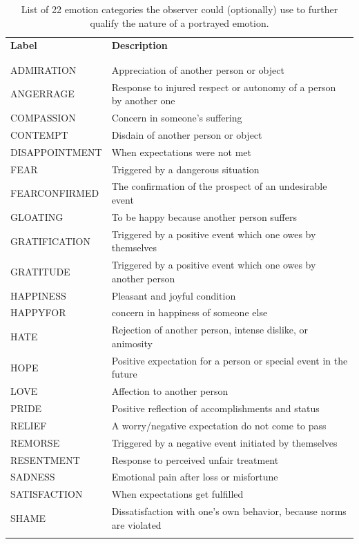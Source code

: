 \documentclass[10pt,a4paper,twocolumn]{article}
\begin{document}
\begin{table}
  \centering
  \begin{tabular}{lp{10cm}}
    \textbf{Label} & \textbf{Description} \\
    \\\hline\\
    ADMIRATION & Appreciation of another person or object \\
    ANGERRAGE & Response to injured respect or autonomy of a person by another one \\
    COMPASSION & Concern in someone's suffering \\
    CONTEMPT & Disdain of another person or object \\
    DISAPPOINTMENT & When expectations were not met \\
    FEAR & Triggered by a dangerous situation \\
    FEARCONFIRMED & The confirmation of the prospect of an undesirable event\\
    GLOATING & To be happy because another person suffers \\
    GRATIFICATION & Triggered by a positive event which one owes by themselves  \\
    GRATITUDE & Triggered by a positive event which one owes by another person \\
    HAPPINESS & Pleasant and joyful condition \\
    HAPPYFOR & concern in happiness of someone else \\
    HATE & Rejection of another person, intense dislike, or animosity \\
    HOPE & Positive expectation for a person or special event in the future \\
    LOVE & Affection to another person \\
    PRIDE & Positive reflection of accomplishments and status \\
    RELIEF & A worry/negative expectation do not come to pass \\
    REMORSE & Triggered by a negative event initiated by themselves \\
    RESENTMENT & Response to perceived unfair treatment \\
    SADNESS & Emotional pain after loss or misfortune \\
    SATISFACTION & When expectations get fulfilled \\
    SHAME & Dissatisfaction with one's own behavior, because norms are violated \\
    \\\hline
  \end{tabular}
  \caption{List of 22 emotion categories the observer could (optionally) use to
    further qualify the nature of a portrayed emotion.}
  \label{tab:emotion_categories}
\end{table}
\end{document}
